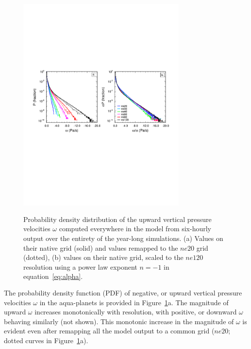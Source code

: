 \documentclass[times]{qjrms4}
\begin{document}
\begin{figure}
\begin{center}
\noindent\includegraphics[width=20pc,angle=0]{figs/temp_2pdf.pdf}\\
\end{center}
\caption{Probability density distribution of the upward vertical pressure velocities $\omega$ computed everywhere in the model from six-hourly output over the entirety of the year-long simulations. (a) Values on their native grid (solid) and values remapped to the $ne20$ grid (dotted), (b) values on their native grid, scaled to the $ne120$ resolution using a power law exponent $n=-1$ in equation~\ref{eq:alpha}.}
\label{fig:2pdf}
\end{figure}

The probability density function (PDF) of negative, or upward vertical pressure velocities $\omega$ in the aqua-planets is provided in Figure~\ref{fig:2pdf}a. The magnitude of upward $\omega$ increases monotonically with resolution, with positive, or downward $\omega$ behaving similarly (not shown). This monotonic increase in the magnitude of $\omega$ is evident even after remapping all the model output to a common grid ($ne20$; dotted curves in Figure~\ref{fig:2pdf}a).
\end{document}
